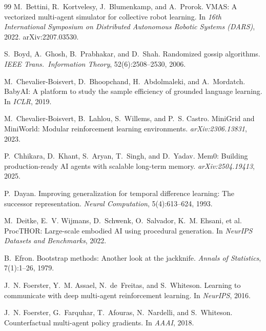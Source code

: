 \documentclass{article}
\begin{document}
\begin{thebibliography}{99}
M.~Bettini, R.~Kortvelesy, J.~Blumenkamp, and A.~Prorok.
\newblock VMAS: A vectorized multi-agent simulator for collective robot learning.
\newblock In \emph{16th International Symposium on Distributed Autonomous Robotic Systems (DARS)}, 2022.
\newblock arXiv:2207.03530.

S.~Boyd, A.~Ghosh, B.~Prabhakar, and D.~Shah.
\newblock Randomized gossip algorithms.
\newblock \emph{IEEE Trans.\ Information Theory}, 52(6):2508--2530, 2006.

M.~Chevalier-Boisvert, D.~Bhoopchand, H.~Abdolmaleki, and A.~Mordatch.
\newblock BabyAI: A platform to study the sample efficiency of grounded language learning.
\newblock In \emph{ICLR}, 2019.

M.~Chevalier-Boisvert, B.~Lahlou, S.~Willems, and P.~S. Castro.
\newblock MiniGrid and MiniWorld: Modular reinforcement learning environments.
\newblock \emph{arXiv:2306.13831}, 2023.

P.~Chhikara, D.~Khant, S.~Aryan, T.~Singh, and D.~Yadav.
\newblock Mem0: Building production-ready AI agents with scalable long-term memory.
\newblock \emph{arXiv:2504.19413}, 2025.

P.~Dayan.
\newblock Improving generalization for temporal difference learning: The successor representation.
\newblock \emph{Neural Computation}, 5(4):613--624, 1993.

M.~Deitke, E.~V. Wijmans, D.~Schwenk, O.~Salvador, K.~M. Ehsani, et al.
\newblock ProcTHOR: Large-scale embodied AI using procedural generation.
\newblock In \emph{NeurIPS Datasets and Benchmarks}, 2022.

B.~Efron.
\newblock Bootstrap methods: Another look at the jackknife.
\newblock \emph{Annals of Statistics}, 7(1):1--26, 1979.

J.~N. Foerster, Y.~M. Assael, N.~de~Freitas, and S.~Whiteson.
\newblock Learning to communicate with deep multi-agent reinforcement learning.
\newblock In \emph{NeurIPS}, 2016.

J.~N. Foerster, G.~Farquhar, T.~Afouras, N.~Nardelli, and S.~Whiteson.
\newblock Counterfactual multi-agent policy gradients.
\newblock In \emph{AAAI}, 2018.


\end{thebibliography}
\end{document}
